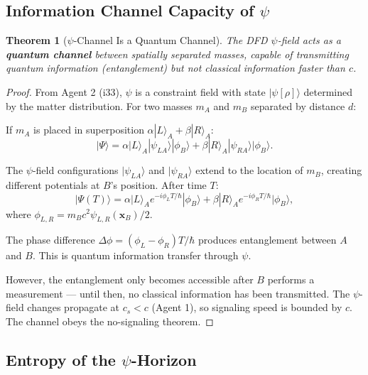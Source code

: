 \documentclass[11pt,a4paper]{article}
\newtheorem{theorem}{Theorem}
\begin{document}
\subsection{Information Channel Capacity of $\psi$}

\begin{theorem}[$\psi$-Channel Is a Quantum Channel]
\label{thm:psi-channel}
The DFD $\psi$-field acts as a \textbf{quantum channel} between spatially separated masses, capable of transmitting quantum information (entanglement) but not classical information faster than $c$.
\end{theorem}

\begin{proof}
From Agent 2 (i33), $\psi$ is a constraint field with state $|\psi[\rho]\rangle$ determined by the matter distribution. For two masses $m_A$ and $m_B$ separated by distance $d$:

If $m_A$ is placed in superposition $\alpha|L\rangle_A + \beta|R\rangle_A$:
\begin{equation}
|\Psi\rangle = \alpha|L\rangle_A|\psi_{LA}\rangle|\phi_B\rangle + \beta|R\rangle_A|\psi_{RA}\rangle|\phi_B\rangle.
\end{equation}

The $\psi$-field configurations $|\psi_{LA}\rangle$ and $|\psi_{RA}\rangle$ extend to the location of $m_B$, creating different potentials at $B$'s position. After time $T$:
\begin{equation}
|\Psi(T)\rangle = \alpha|L\rangle_A e^{-i\phi_L T/\hbar}|\phi_B\rangle + \beta|R\rangle_A e^{-i\phi_R T/\hbar}|\phi_B\rangle,
\end{equation}
where $\phi_{L,R} = m_B c^2\psi_{L,R}(\mathbf{x}_B)/2$.

The phase difference $\Delta\phi = (\phi_L - \phi_R)T/\hbar$ produces entanglement between $A$ and $B$. This is quantum information transfer through $\psi$.

However, the entanglement only becomes accessible after $B$ performs a measurement --- until then, no classical information has been transmitted. The $\psi$-field changes propagate at $c_s < c$ (Agent 1), so signaling speed is bounded by $c$. The channel obeys the no-signaling theorem.
\end{proof}

\subsection{Entropy of the $\psi$-Horizon}
\end{document}
